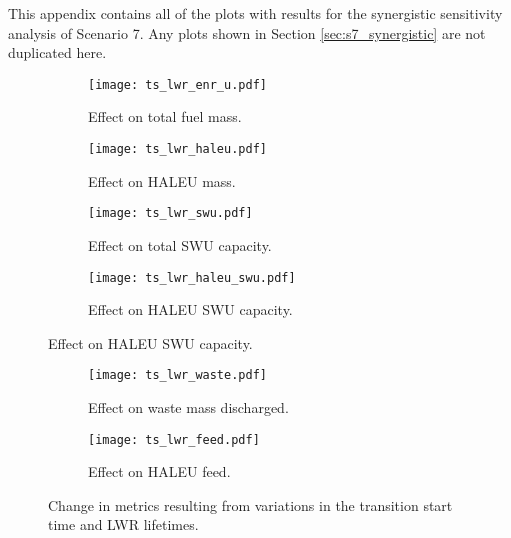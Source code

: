 This appendix contains all of the plots with results for the synergistic 
sensitivity analysis of Scenario 7. Any plots shown in Section 
\ref{sec:s7_synergistic} are not duplicated here.

\begin{figure}
    \begin{subfigure}[b]{0.48\textwidth}
        \centering
        \texttt{[image: ts\_lwr\_enr\_u.pdf]}
        \caption{Effect on total fuel mass.}
        \label{fig:ts_lwr_enr_u}
    \end{subfigure}
    \hfill
    \begin{subfigure}[b]{0.48\textwidth}
        \centering
        \texttt{[image: ts\_lwr\_haleu.pdf]}
        \caption{Effect on HALEU mass.}
        \label{fig:ts_lwr_haleu}
    \end{subfigure}
    
    \begin{subfigure}[b]{0.48\textwidth}
        \centering
        \texttt{[image: ts\_lwr\_swu.pdf]}
        \caption{Effect on total SWU capacity.}
        \label{fig:ts_lwr_swu}
    \end{subfigure}
    \hfill
    \begin{subfigure}[b]{0.48\textwidth}
        \centering
        \texttt{[image: ts\_lwr\_haleu\_swu.pdf]}
        \caption{Effect on HALEU SWU capacity.}
        \label{fig:ts_lwr_haleu_swu}
    \end{subfigure}
\end{figure}

\begin{figure}
    \ContinuedFloat    
    \begin{subfigure}[b]{0.48\textwidth}
        \centering
        \texttt{[image: ts\_lwr\_waste.pdf]}
        \caption{Effect on waste mass discharged.}
        \label{fig:ts_lwr_waste}
    \end{subfigure}
    \hfill
    \begin{subfigure}[b]{0.48\textwidth}
        \centering
        \texttt{[image: ts\_lwr\_feed.pdf]}
        \caption{Effect on HALEU feed.}
        \label{fig:ts_lwr_feed}
    \end{subfigure}
    \caption{Change in metrics resulting from variations in the 
    transition start time and LWR lifetimes.}
    \label{fig:ts_lwr}
\end{figure}

